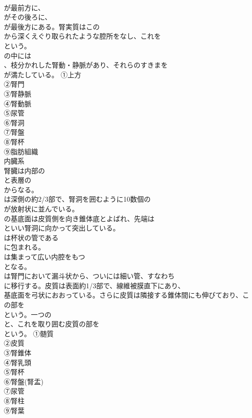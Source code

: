 \documentclass[8pt]{extreport}
\begin{document}
\begin{CJK}{UTF8}{min}
\\	が最前方に、
\\	がその後ろに、
\\	が最後方にある。腎実質はこの
\\	から深くえぐり取られたような腔所をなし、これを
\\	という。
\\	の中には
\\	、枝分かれした腎動・静脈があり、それらのすきまを
\\	が満たしている。	①上方
\\	②腎門
\\	③腎静脈
\\	④腎動脈
\\	⑤尿管
\\	⑥腎洞
\\	⑦腎盤
\\	⑧腎杯
\\	⑨脂肪組織
\\	内臓系
\\	腎臓は内部の
\\	と表層の
\\	からなる。
\\	は深側の約2/3部で、腎洞を囲むように10数個の
\\	が放射状に並んでいる。
\\	の基底面は皮質側を向き錐体底とよばれ、先端は
\\	といい腎洞に向かって突出している。
\\	は杯状の管である
\\	に包まれる。
\\	は集まって広い内腔をもつ
\\	となる。
\\	は腎門において漏斗状から、ついには細い管、すなわち
\\	に移行する。皮質は表面約1/3部で、線維被膜直下にあり、
\\	基底面を弓状におおっている。さらに皮質は隣接する錐体間にも伸びており、この部を
\\	という。一つの
\\	と、これを取り囲む皮質の部を
\\	という。	①髄質
\\	②皮質
\\	③腎錐体
\\	④腎乳頭
\\	⑤腎杯
\\	⑥腎盤(腎盂)
\\	⑦尿管
\\	⑧腎柱
\\	⑨腎葉

\end{CJK}
\end{document}
